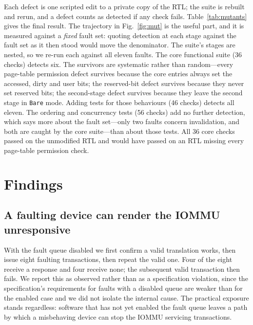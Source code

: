 \documentclass[conference]{IEEEtran}
\begin{document}
Each defect is one scripted edit to a private copy of the RTL; the suite is
rebuilt and rerun, and a defect counts as detected if any check fails.
Table~\ref{tab:mutants} gives the final result. The trajectory in
Fig.~\ref{fig:mut} is the useful part, and it is measured against a \emph{fixed}
fault set: quoting detection at each stage against the fault set as it then
stood would move the denominator. The suite's stages are nested, so we re-run
each against all eleven faults. The core functional suite (36 checks) detects
six. The survivors are systematic rather than random---every page-table
permission defect survives because the core entries always set the accessed,
dirty and user bits; the reserved-bit defect survives because they never set
reserved bits; the second-stage defect survives because they leave the second
stage in \texttt{Bare} mode. Adding tests for those behaviours (46 checks)
detects all eleven. The ordering and concurrency tests (56 checks) add no
further detection, which says more about the fault set---only two faults concern
invalidation, and both are caught by the core suite---than about those tests.
All 36 core checks passed on the unmodified RTL and would have passed on an RTL
missing every page-table permission check.

\section{Findings}

\subsection{A faulting device can render the IOMMU unresponsive}
With the fault queue disabled we first confirm a valid translation works, then
issue eight faulting transactions, then repeat the valid one. Four of the eight
receive a response and four receive none; the subsequent valid transaction then
fails. We report this as observed rather than as a specification violation,
since the specification's requirements for faults with a disabled queue are
weaker than for the enabled case and we did not isolate the internal cause. The
practical exposure stands regardless: software that has not yet enabled the
fault queue leaves a path by which a misbehaving device can stop the IOMMU
servicing transactions.
\end{document}
